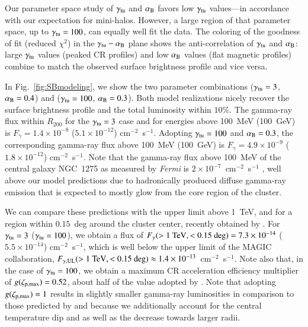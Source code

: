 \documentclass[useAMS,usenatbib]{mn2e}
\begin{document}
Our parameter space study of $\gamma_{{\mathrm{tu}}}$ and $\alpha_{{\mathrm{B}}}$ favors
low $\gamma_{{\mathrm{tu}}}$ values---in accordance with our expectation for
mini-halos. However, a large region of that parameter space, up to
$\gamma_{{\mathrm{tu}}} = 100$, can equally well fit the data. The coloring of the
goodness of fit (reduced $\chi^2$) in the $\gamma_{{\mathrm{tu}}}-\alpha_{{\mathrm{B}}}$
plane shows the anti-correlation of $\gamma_{{\mathrm{tu}}}$ and $\alpha_{{\mathrm{B}}}$:
large $\gamma_{{\mathrm{tu}}}$ values (peaked CR profiles) and low $\alpha_{{\mathrm{B}}}$
values (flat magnetic profiles) combine to match the observed surface brightness
profile and vice versa.

In Fig.~\ref{fig:SBmodeling}, we show the two parameter combinations
($\gamma_{{\mathrm{tu}}}=3$, $\alpha_{{\mathrm{B}}}=0.4$) and ($\gamma_{{\mathrm{tu}}}=100$,
$\alpha_{{\mathrm{B}}}=0.3$). Both model realizations nicely recover the surface
brightness profile and the total luminosity within $10\%$.  The gamma-ray flux
within $R_{200}$ for the $\gamma_{{\mathrm{tu}}}=3$ case and for energies above
100~MeV (100~GeV) is $F_{\gamma} = 1.4 \times 10^{-8}$ ($5.1 \times 10^{-12}$)
cm$^{-2}$~s$^{-1}$. Adopting $\gamma_{{\mathrm{tu}}}=100$ and $ \alpha_{{\mathrm{B}}}=0.3$, the
corresponding gamma-ray flux above 100~MeV (100~GeV) is $F_{\gamma} = 4.9 \times
10^{-9}$ ($1.8 \times 10^{-12}$) cm$^{-2}$~s$^{-1}$. Note that the gamma-ray
flux above 100~MeV of the central galaxy NGC~1275 as measured by \emph{Fermi} is
$2 \times 10^{-7}$~cm$^{-2}$~s$^{-1}$ \citep{2009arXiv0904.1904T}, well above
our model predictions due to hadronically produced diffuse gamma-ray emission
that is expected to mostly glow from the core region of the cluster.

We can compare these predictions with the upper limit above 1~TeV, and for a
region within $0.15$~deg around the cluster center, recently obtained by
\cite{2011arXiv1111.5544M}. For $\gamma_{{\mathrm{tu}}}=3$ ($\gamma_{{\mathrm{tu}}}=100$),
we obtain a flux of $F_{\gamma}(>1~{\mathrm{TeV}},<0.15~{\mathrm{deg}}) = 7.3 \times
10^{-14}$ ($5.5 \times 10^{-14}$) cm$^{-2}$~s$^{-1}$, which is well below the
upper limit of the MAGIC collaboration,
$F_{\gamma,{\mathrm{UL}}}(>1~{\mathrm{TeV}},<0.15~{\mathrm{deg}}) \approx 1.4 \times
10^{-13}$~cm$^{-2}$~s$^{-1}$. Note also that, in the case of $\gamma_{{\mathrm{tu}}}
= 100$, we obtain a maximum CR acceleration efficiency multiplier of
$g(\zeta_{{\mathrm{p,max}}})=0.52$, about half of the value adopted by
\cite{2010MNRAS.409..449P}. Note that adopting $g(\zeta_{{\mathrm{p,max}}})=1$
results in slightly smaller gamma-ray luminosities in comparison to those
predicted by \cite{2010MNRAS.409..449P} and \cite{2011arXiv1105.3240P} because
we additionally account for the central temperature dip and as well as the
decrease towards larger radii.
\end{document}

